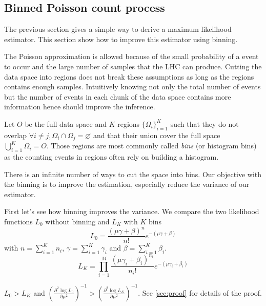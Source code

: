 \subsection{Binned Poisson count process} %
\label{sub:binned_poisson_count_process}

The previous section gives a simple way to derive a maximum likelihood estimator.
This section show how to improve this estimator using binning.

The Poisson approximation is allowed because of the small probability of a event to occur and the large number of samples that the LHC can produce.
Cutting the data space into regions does not break these assumptions as long as the regions contains enough samples.
Intuitively knowing not only the total number of events but the number of events in each chunk of the data space contains more information hence should improve the inference.

Let $O$ be the full data space and $K$ regions $\{\Omega_i\}_{i=1}^K$ such that they do not overlap $\forall i\neq j, \Omega_i \cap \Omega_j = \varnothing $ and that their union cover the full space $\bigcup_{i=1}^K \Omega_i = O$.
Those regions are most commonly called \emph{bins} (or histogram bins) as the counting events in regions often rely on building a histogram.

There is an infinite number of ways to cut the space into bins.
Our objective with the binning is to improve the estimation, especially reduce the variance of our estimator.

First let's see how binning improves the variance.
We compare the two likelihood functions $L_0$ without binning and $L_K$ with $K$ bins
\begin{equation}
    L_0 = \frac{(\mu \gamma + \beta)^n }{n!} e^{-(\mu \gamma + \beta)}
\end{equation}
with $n = \sum_{i=1}^K n_i $, $\gamma = \sum_{i=1}^K \gamma_i $ and $\beta = \sum_{i=1}^K \beta_i $.
\begin{equation}
    \label{eq:binned_poisson_likelihood}
    L_K = \prod_{i=1}^M \frac{(\mu \gamma_i + \beta_i)^{n_i} }{n_i!} e^{-(\mu \gamma_i + \beta_i)}
\end{equation}

$L_0 > L_K$ and 
$\left (\frac{\partial^2 \log L_0}{\partial \mu^2}\right )^{-1} > \left (\frac{\partial^2 \log L_K}{\partial \mu^2}\right )^{-1}$.
See \autoref{sec:proof} for details of the proof.

